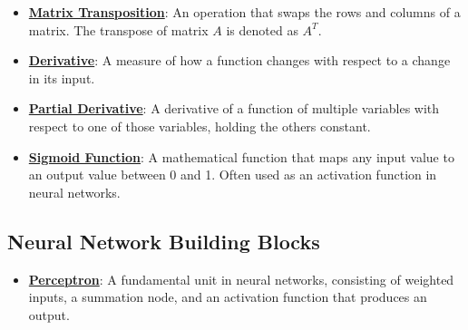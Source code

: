 \documentclass{article}%
\begin{document}
\begin{itemize}[leftmargin=*]
\item \href{https://purdue.brightspace.com/d2l/common/assets/pdfjs-d2l-dist/1.0.14-legacy/web/viewer.html?file=\%2Fcontent\%2Fenforced\%2F1095467-wl.202510.CS.24300.001\%2F04L1-Linear Algebra Primer.pdf\%3Fou\%3D1095467\&lang=en-us\&container=d2l-fileviewer-rendered-pdf\&fullscreen=d2l-fileviewer-rendered-pdf-dialog\&height=667#page=16}{\textbf{Matrix Transposition}}: An operation that swaps the rows and columns of a matrix. The transpose of matrix $A$ is denoted as $A^T$.%
\item \href{https://purdue.brightspace.com/d2l/common/assets/pdfjs-d2l-dist/1.0.14-legacy/web/viewer.html?file=\%2Fcontent\%2Fenforced\%2F1095467-wl.202510.CS.24300.001\%2F04L1-Linear Algebra Primer.pdf\%3Fou\%3D1095467\&lang=en-us\&container=d2l-fileviewer-rendered-pdf\&fullscreen=d2l-fileviewer-rendered-pdf-dialog\&height=667#page=21}{\textbf{Derivative}}: A measure of how a function changes with respect to a change in its input.%
\item \href{https://purdue.brightspace.com/d2l/common/assets/pdfjs-d2l-dist/1.0.14-legacy/web/viewer.html?file=\%2Fcontent\%2Fenforced\%2F1095467-wl.202510.CS.24300.001\%2F04L1-Linear Algebra Primer.pdf\%3Fou\%3D1095467\&lang=en-us\&container=d2l-fileviewer-rendered-pdf\&fullscreen=d2l-fileviewer-rendered-pdf-dialog\&height=667#page=19}{\textbf{Partial Derivative}}: A derivative of a function of multiple variables with respect to one of those variables, holding the others constant.%
\item \href{https://purdue.brightspace.com/d2l/common/assets/pdfjs-d2l-dist/1.0.14-legacy/web/viewer.html?file=\%2Fcontent\%2Fenforced\%2F1095467-wl.202510.CS.24300.001\%2F04L1-Linear Algebra Primer.pdf\%3Fou\%3D1095467\&lang=en-us\&container=d2l-fileviewer-rendered-pdf\&fullscreen=d2l-fileviewer-rendered-pdf-dialog\&height=667#page=21}{\textbf{Sigmoid Function}}: A mathematical function that maps any input value to an output value between 0 and 1. Often used as an activation function in neural networks.%
\end{itemize}

%
\subsection{Neural Network Building Blocks}%
\label{subsec:NeuralNetworkBuildingBlocks}%
\begin{itemize}[leftmargin=*]%
\item \href{https://purdue.brightspace.com/d2l/common/assets/pdfjs-d2l-dist/1.0.14-legacy/web/viewer.html?file=\%2Fcontent\%2Fenforced\%2F1095467-wl.202510.CS.24300.001\%2F02L2-Intro.pdf\%3Fou\%3D1095467\&lang=en-us\&container=d2l-fileviewer-rendered-pdf\&fullscreen=d2l-fileviewer-rendered-pdf-dialog\&height=667#page=45}{\textbf{Perceptron}}: A fundamental unit in neural networks, consisting of weighted inputs, a summation node, and an activation function that produces an output.%
\end{itemize}
\end{document}

